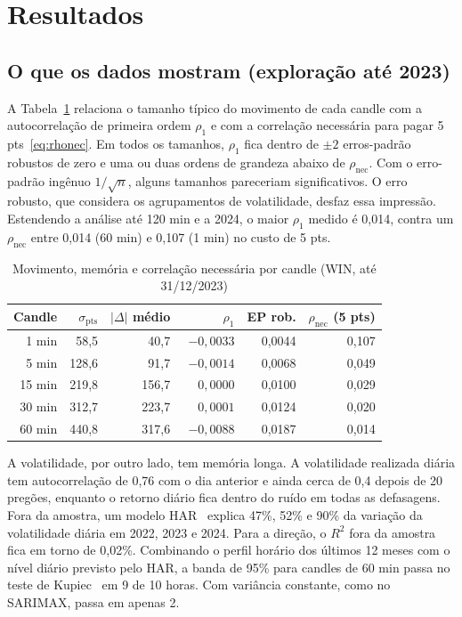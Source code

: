 \documentclass[conference]{IEEEtran}
\begin{document}
\section{Resultados}

\subsection{O que os dados mostram (exploração até 2023)}

A Tabela~\ref{tab:rho1} relaciona o tamanho típico do movimento de cada candle com a autocorrelação de primeira ordem $\rho_1$ e com a correlação necessária para pagar 5 pts~\eqref{eq:rhonec}. Em todos os tamanhos, $\rho_1$ fica dentro de $\pm 2$ erros-padrão robustos de zero e uma ou duas ordens de grandeza abaixo de $\rho_{\text{nec}}$. Com o erro-padrão ingênuo $1/\sqrt{n}$, alguns tamanhos pareceriam significativos. O erro robusto, que considera os agrupamentos de volatilidade, desfaz essa impressão. Estendendo a análise até 120 min e a 2024, o maior $\rho_1$ medido é 0,014, contra um $\rho_{\text{nec}}$ entre 0,014 (60 min) e 0,107 (1 min) no custo de 5 pts.

\begin{table}[!t]
\centering
\caption{Movimento, memória e correlação necessária por candle (WIN, até 31/12/2023)}
\label{tab:rho1}
\footnotesize
\setlength{\tabcolsep}{4pt}
\begin{tabular}{@{}rrrrrr@{}}
\toprule
Candle & $\sigma_{\text{pts}}$ & $|\Delta|$ médio & $\rho_1$ & EP rob. & $\rho_{\text{nec}}$ (5 pts) \\
\midrule
1 min  &  58,5 &  40,7 & $-0{,}0033$ & 0,0044 & 0,107 \\
5 min  & 128,6 &  91,7 & $-0{,}0014$ & 0,0068 & 0,049 \\
15 min & 219,8 & 156,7 & $\phantom{-}0{,}0000$ & 0,0100 & 0,029 \\
30 min & 312,7 & 223,7 & $\phantom{-}0{,}0001$ & 0,0124 & 0,020 \\
60 min & 440,8 & 317,6 & $-0{,}0088$ & 0,0187 & 0,014 \\
\bottomrule
\end{tabular}
\end{table}

A volatilidade, por outro lado, tem memória longa. A volatilidade realizada diária tem autocorrelação de 0,76 com o dia anterior e ainda cerca de 0,4 depois de 20 pregões, enquanto o retorno diário fica dentro do ruído em todas as defasagens. Fora da amostra, um modelo HAR~\cite{corsi2009} explica 47\%, 52\% e 90\% da variação da volatilidade diária em 2022, 2023 e 2024. Para a direção, o $R^2$ fora da amostra fica em torno de 0,02\%. Combinando o perfil horário dos últimos 12 meses com o nível diário previsto pelo HAR, a banda de 95\% para candles de 60 min passa no teste de Kupiec~\cite{kupiec1995} em 9 de 10 horas. Com variância constante, como no SARIMAX, passa em apenas 2.
\end{document}
